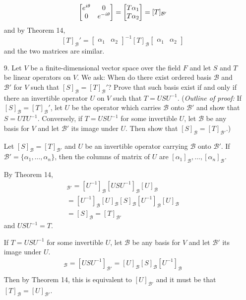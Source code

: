 \documentclass{article}
\begin{document}
\begin{enumerate}[listparindent=\parindent]
    \[ \begin{bmatrix} e^{i\theta} & 0 \\ 0 & e^{-i\theta} \end{bmatrix} = \begin{bmatrix}T\alpha_1 \\ T\alpha_2\end{bmatrix} = [T]_{\mathcal{B}'} \\ \]
    and by Theorem 14,
    \[ [T]_{\mathcal{B}}' = \begin{bmatrix}\alpha_1 & \alpha_2\end{bmatrix}^{-1} [T]_{\mathcal{B}} \begin{bmatrix}\alpha_1 & \alpha_2\end{bmatrix} \]
    and the two matrices are similar.

\item[9.] Let \(V\) be a finite-dimensional vector space over the field \(F\) and let \(S\) and \(T\) be linear operators on \(V\).
    We ask: When do there exist ordered basis \(\mathcal{B}\) and \(\mathcal{B}'\) for \(V\) such that \([S]_\mathcal{B} = [T]_\mathcal{B}'\)?
    Prove that such basis exist if and only if there an invertible operator \(U\) on \(V\) such that \(T = USU^{-1}\).
    (\textit{Outline of proof:} If \([S]_\mathcal{B} = [T]_\mathcal{B}'\),
    let \(U\) be the operator which carries \(\mathcal{B}\) onto \(\mathcal{B}'\) and show that \(S = UTU^{-1}\).
    Conversely, if \(T = USU^{-1}\) for some invertible \(U\), let \(\mathcal{B}\) be any basis for \(V\) and let \(\mathcal{B}'\) its image under \(U\).
    Then show that \([S]_\mathcal{B} = [T]_\mathcal{B'}\).)

    Let \([S]_\mathcal{B} = [T]_\mathcal{B'}\) and \(U\) be an invertible operator carrying \(\mathcal{B}\) onto \(\mathcal{B}'\).
    If \(\mathcal{B'} = \{\alpha_1, \dots, \alpha_n\}\), then the columns of matrix of \(U\) are \([\alpha_1]_\mathcal{B}, \dots, [\alpha_n]_\mathcal{B}\).

    By Theorem 14,
    \begin{gather*}
        [USU^{-1}]_\mathcal{B'} = [U^{-1}]_\mathcal{B}[USU^{-1}]_\mathcal{B}[U]_\mathcal{B} \\
        = [U^{-1}]_\mathcal{B}[U]_\mathcal{B}[S]_\mathcal{B}[U^{-1}]_\mathcal{B}[U]_\mathcal{B} \\
        = [S]_\mathcal{B} = [T]_\mathcal{B'}
    \end{gather*}
    and \(USU^{-1} = T\).

    If \(T = USU^{-1}\) for some invertible \(U\), let \(\mathcal{B}\) be any basis for \(V\) and let \(\mathcal{B'}\) its image under \(U\).
    \begin{gather*}
        [T]_\mathcal{B} = [USU^{-1}]_\mathcal{B'} = [U]_\mathcal{B}[S]_\mathcal{B}[U^{-1}]_\mathcal{B} \\
    \end{gather*}
    Then by Theorem 14, this is equivalent to \([U]_\mathcal{B'}\) and it must be that \([T]_\mathcal{B} = [U]_\mathcal{B'}\).


\end{enumerate}
\end{document}
